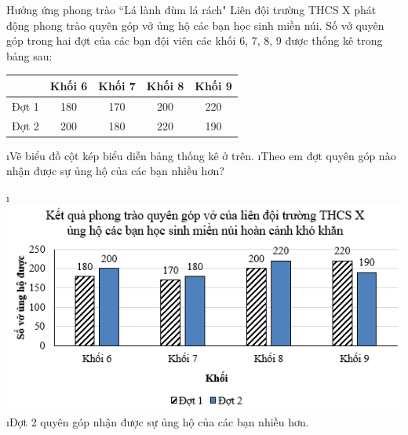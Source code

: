 \begin{bt}
	Hưởng ứng phong trào  ``Lá lành đùm lá rách" Liên đội trường THCS X phát động phong trào quyên góp vở ủng hộ các bạn học sinh miền núi. Số vở quyên góp trong hai đợt của các bạn đội viên các khối 6, 7, 8, 9 được thống kê trong bảng sau:
	\begin{center}
		\begin{tabular}{|c|c|c|c|c|}
			\hline
			&Khối 6&	Khối 7&	Khối 8&	Khối 9\\
			\hline
			Đợt 1&	180&	170&	200&	220\\
			\hline
			Đợt 2&	200&	180&	220&	190\\
			\hline
		\end{tabular}
	\end{center}
	\begin{enumerate}[a),leftmargin=*]
		\i Vẽ biểu đồ cột kép biểu diễn bảng thống kê ở trên.
		\i Theo em đợt quyên góp nào nhận được sự ủng hộ của các bạn nhiều hơn?
	\end{enumerate}
	\begin{loigiaichuong40}
		\begin{enumerate}[a),leftmargin=*]
			\i \includegraphics[width=0.5\linewidth]{12}
			\i Đợt 2 quyên góp nhận được sự ủng hộ của các bạn nhiều hơn.
		\end{enumerate}
	\end{loigiaichuong40}
\end{bt}
